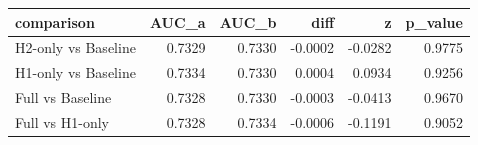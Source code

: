 \begin{tabular}{lrrrrr}
\toprule
comparison & AUC_a & AUC_b & diff & z & p_value \\
\midrule
H2-only vs Baseline & 0.7329 & 0.7330 & -0.0002 & -0.0282 & 0.9775 \\
H1-only vs Baseline & 0.7334 & 0.7330 & 0.0004 & 0.0934 & 0.9256 \\
Full vs Baseline & 0.7328 & 0.7330 & -0.0003 & -0.0413 & 0.9670 \\
Full vs H1-only & 0.7328 & 0.7334 & -0.0006 & -0.1191 & 0.9052 \\
\bottomrule
\end{tabular}
